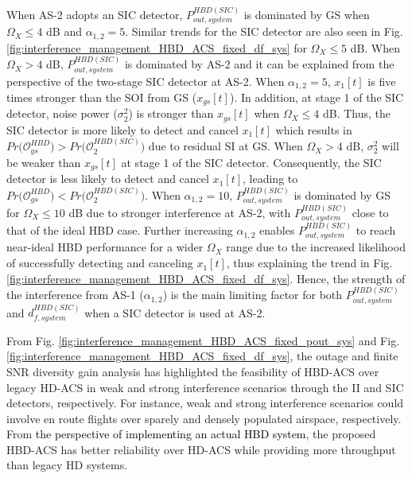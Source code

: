 When AS-2 adopts an SIC detector, $P_{out,system}^{HBD(SIC)}$ is dominated by GS when $\Omega_X\leq4$ dB and $\alpha_{1,2}=5$. Similar trends for the SIC detector are also seen in Fig. \ref{fig:interference_management_HBD_ACS_fixed_df_sys} for $\Omega_X \leq 5$ dB. When $\Omega_X>4$ dB, $P_{out,system}^{HBD(SIC)}$ is dominated by AS-2 and it can be explained from the perspective of the two-stage SIC detector at AS-2. When $\alpha_{1,2}=5$, $x_1[t]$ is five times stronger than the SOI from GS ($x_{gs}[t]$). In addition, at stage 1 of the SIC detector, noise power ($\sigma^2_{2}$) is stronger than $x_{gs}[t]$ when $\Omega_X\leq4$ dB. Thus, the SIC detector is more likely to detect and cancel $x_1[t]$ which results in $Pr\big(\mathcal{O}_{gs}^{HBD}\big)>Pr\big(\mathcal{O}_{2}^{HBD(SIC)}\big)$ due to residual SI at GS. When $\Omega_X>4$ dB, $\sigma_2^2$ will be weaker than $x_{gs}[t]$ at stage 1 of the SIC detector. Consequently, the SIC detector is less likely to detect and cancel $x_1[t]$, leading to $Pr\big(\mathcal{O}_{gs}^{HBD}\big)<Pr\big(\mathcal{O}_{2}^{HBD(SIC)}\big)$. When $\alpha_{1,2}=10$, $P_{out,system}^{HBD(SIC)}$ is dominated by GS for $\Omega_X \leq 10$ dB due to stronger interference at AS-2, with $P_{out,system}^{HBD(SIC)}$ close to that of the ideal HBD case. Further increasing $\alpha_{1,2}$ enables $P_{out,system}^{HBD(SIC)}$ to reach near-ideal HBD performance for a wider $\Omega_X$ range due to the increased likelihood of successfully detecting and canceling $x_1[t]$, thus explaining the trend in Fig. \ref{fig:interference_management_HBD_ACS_fixed_df_sys}. Hence, the strength of the interference from AS-1 ($\alpha_{1,2}$) is the main limiting factor for both $P_{out,system}^{HBD(SIC)}$ and $d_{f,system}^{HBD(SIC)}$ when a SIC detector is used at AS-2. 


From Fig. \ref{fig:interference_management_HBD_ACS_fixed_pout_sys} and Fig. \ref{fig:interference_management_HBD_ACS_fixed_df_sys}, the outage and finite SNR diversity gain analysis has highlighted the feasibility of HBD-ACS over legacy HD-ACS in weak and strong interference scenarios through the II and SIC detectors, respectively. For instance, weak and strong interference scenarios could involve en route flights over sparely and densely populated airspace, respectively. From \textcolor{black}{the perspective of implementing an actual HBD system}, the proposed HBD-ACS has better reliability over HD-ACS while providing more throughput than legacy HD systems. 

